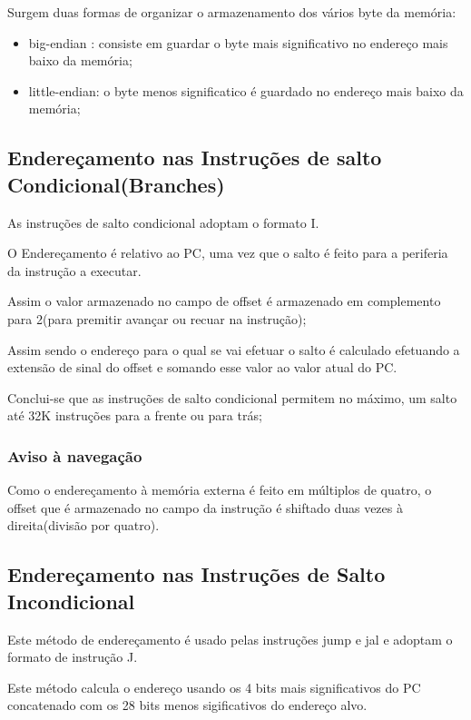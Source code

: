 \documentclass[10pt,a4paper]{book}
\begin{document}
		Surgem duas formas de organizar o armazenamento dos vários byte da memória:
		\begin{itemize}
			\item big-endian : consiste em guardar o byte mais significativo no endereço mais baixo da memória;
			\item little-endian: o byte menos significatico é guardado no endereço mais baixo da memória;
		\end{itemize}

		\subsection{Endereçamento nas Instruções de salto Condicional(Branches) }

			As instruções de salto condicional adoptam o formato I.

			O Endereçamento é relativo ao PC, uma vez que o salto é feito para a periferia da instrução a executar.

			Assim o valor armazenado no campo de offset é armazenado em complemento para 2(para premitir avançar ou recuar na instrução);

			Assim sendo o endereço para o qual se vai efetuar o salto é calculado efetuando a extensão de sinal do offset e somando esse valor ao valor atual do PC.

			Conclui-se que as instruções de salto condicional permitem no máximo, um salto até 32K instruções para a frente ou para trás;

			\subsubsection{Aviso à navegação}
				Como o endereçamento à memória externa é feito em múltiplos de quatro, o offset que é armazenado no campo da instrução é shiftado duas vezes à direita(divisão por quatro).

			\subsection{Endereçamento nas Instruções de Salto Incondicional }

			Este método de endereçamento é usado pelas instruções jump e jal e adoptam o formato de instrução J.

			Este método calcula o endereço usando os 4 bits mais significativos do PC concatenado com os 28 bits menos sigificativos do endereço alvo.
\end{document}
